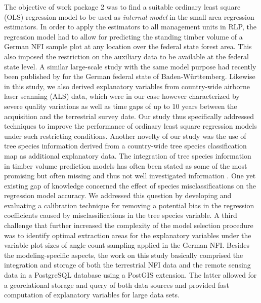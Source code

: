 The objective of work package 2 was to find a suitable ordinary least square (OLS) regression model to be used as \textit{internal model} in the small area regression estimators. In order to apply the estimators to all management units in RLP, the regression model had to allow for predicting the standing timber volume of a German NFI sample plot at any location over the federal state forest area. This also imposed the restriction on the auxiliary data to be available at the federal state level. A similar large-scale study with the same model purpose had recently been published by \citet{maack2016} for the German federal state of Baden-W{\"u}rttemberg. Likewise in this study, we also derived explanatory variables from country-wide airborne laser scanning (ALS) data, which were in our case however characterized by severe quality variations as well as time gaps of up to 10 years between the acquisition and the terrestrial survey date. Our study thus specifically addressed techniques to improve the performance of ordinary least square regression models under such restricting conditions. Another novelty of our study was the use of tree species information derived from a country-wide tree species classification map as additional explanatory data. The integration of tree species information in timber volume prediction models has often been stated as some of the most promising but often missing and thus not well investigated information \citep{koch2010, white2016}. One yet existing gap of knowledge concerned the effect of species misclassifications on the regression model accuracy. We addressed this question by developing and evaluating a calibration technique for removing a potential bias in the regression coefficients caused by misclassifications in the tree species variable. A third challenge that further increased the complexity of the model selection procedure was to identify optimal extraction areas for the explanatory variables under the variable plot sizes of angle count sampling applied in the German NFI. Besides the modeling-specific aspects, the work on this study basically comprised the integration and storage of both the terrestrial NFI data and the remote sensing data in a PostgreSQL database using a PostGIS extension. The latter allowed for a georelational storage and query of both data sources and provided fast computation of explanatory variables for large data sets.

%


